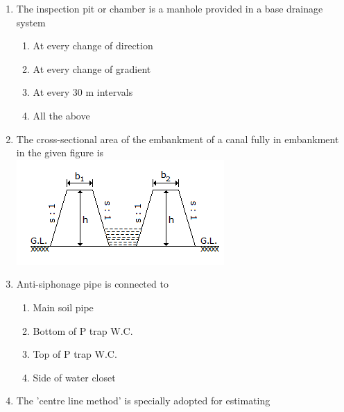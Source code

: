 \documentclass[11pt,a4paper]{article}
\begin{document}
\begin{enumerate}
\begin{enumerate}[label=\Alph*.]
\end{enumerate}
\item{The inspection pit or chamber is a manhole provided in a base drainage system}
\begin{enumerate}[label=\Alph*.]
\item{At every change of direction}
\item{At every change of gradient}
\item{At every 30 m intervals}
\item{All the above}
\end{enumerate}
\item{The cross-sectional area of the embankment of a canal fully in embankment in the given figure is \\

\includegraphics{../data_img/estimating-and-costing_1525417845-31.png}
}
\\
\item{Anti-siphonage pipe is connected to}
\begin{enumerate}[label=\Alph*.]
\item{Main soil pipe}
\item{Bottom of P trap W.C.}
\item{Top of P trap W.C.}
\item{Side of water closet}
\end{enumerate}
\item{The 'centre line method' is specially adopted for estimating}

\end{enumerate}
\end{document}
